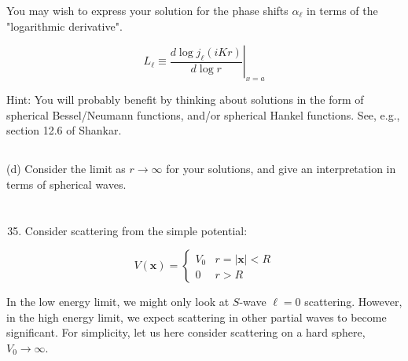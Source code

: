 \documentclass[12pt]{article}
\begin{document}
You may wish to express your solution for the phase shifts $\alpha_{\ell}$ in terms of the "logarithmic derivative".


\begin{equation*}
\left.L_{\ell} \equiv \frac{d \log j_{\ell}(i K r)}{d \log r}\right|_{x=a} \tag{8}
\end{equation*}


Hint: You will probably benefit by thinking about solutions in the form of spherical Bessel/Neumann functions, and/or spherical Hankel functions. See, e.g., section 12.6 of Shankar.
\subsection{}

(d) Consider the limit as $r \rightarrow \infty$ for your solutions, and give an interpretation in terms of spherical waves.
\section{}
\begin{enumerate}
  \setcounter{enumi}{34}
  \item Consider scattering from the simple potential:
\end{enumerate}

$$
V(\mathbf{x})= \begin{cases}V_{0} & r=|\mathbf{x}|<R \\ 0 & r>R\end{cases}
$$

In the low energy limit, we might only look at $S$-wave $\ell=0$ scattering. However, in the high energy limit, we expect scattering in other partial waves to become significant. For simplicity, let us here consider scattering on a hard sphere, $V_{0} \rightarrow \infty$.
\end{document}
